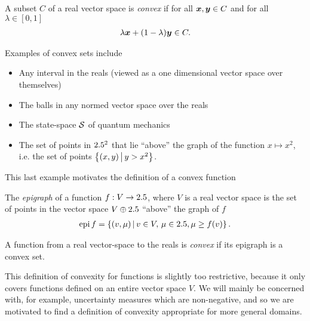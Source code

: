 \begin{defn}\label{defn:convex-set}
  A subset $C$ of a real vector space is \emph{convex} if for all $\bm{x},\bm{y}\in C$ and for all $\lambda\in [0,1]$
  \begin{align}
    \lambda \bm{x} + (1-\lambda)\bm{y}\in C.
  \end{align}
\end{defn}
Examples of convex sets include
\begin{itemize}
  \item Any interval in the reals (viewed as a one dimensional vector space over themselves)
  \item The balls in any normed vector space over the reals
  \item The state-space $\dops$ of quantum mechanics
  \item The set of points in $2.5^2$ that lie ``above'' the graph of the function $x\mapsto x^2$, i.e. the set of points $\left\{(x,y)\,\middle|\,y > x^2\right\}$.
\end{itemize}
This last example motivates the definition of a convex function
\begin{defn}\label{defn:epigraph}
  The \emph{epigraph} of a function $f:V\to2.5$, where $V$ is a real vector space is the set of points in the vector space $V\oplus 2.5$  ``above'' the graph of $f$
  \begin{align}
    \operatorname{epi} f = \left\{(v, \mu)\,\middle|\,v\in V,\, \mu\in2.5, \mu \geq f(v)\right\}.
  \end{align}
\end{defn}
\begin{defn}\label{defn:real-convex-function}
  A function from a real vector-space to the reals is \emph{convex} if its epigraph is a convex set.
\end{defn}
This definition of convexity for functions is slightly too restrictive, because it only covers functions defined on an entire vector space $V$. We will mainly be concerned with, for example, uncertainty measures which are non-negative, and so we are motivated to find a definition of convexity appropriate for more general domains.
